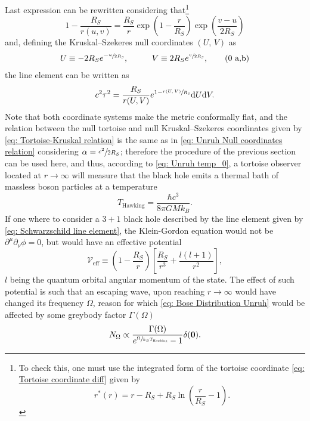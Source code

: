 Last expression can be rewritten considering that\footnote{To check this, one must use the integrated form of the tortoise coordinate \ref{eq: Tortoise coordinate diff} given by $$r^*(r)=r-R_S+R_S\ln\left(\frac{r}{R_S}-1\right).$$}
\begin{equation}
	1-\frac{R_S}{r\left(u,v\right)}=\frac{R_S}{r}\exp{\left(1-\frac{r}{R_S}\right)}\exp{\left(\frac{v-u}{2R_S}\right)}
\end{equation} 
and, defining the Kruskal–Szekeres null coordinates $(U,\,V)$ as
\begin{subequations}\label{eq: Tortoise-Kruskal relation}
	\begin{gather}
		U\equiv -2R_Se^{-\sfrac{u}{2R_S}},\hspace{1.0cm}V\equiv 2R_Se^{\sfrac{v}{2R_S}},\tag{\theequation \,\,a,b}
	\end{gather}
\end{subequations}
the line element can be written as
\begin{equation}
	c^2\tau^2=\frac{R_S}{r(U,V)}e^{1-\sfrac{r(U,V)}{R_S}}\text{d} U\text{d} V.
\end{equation}
Note that both coordinate systems make the metric conformally flat, and the relation between the null tortoise and null Kruskal–Szekeres coordinates given by \ref{eq: Tortoise-Kruskal relation} is the same as in \ref{eq: Unruh Null coordinates relation} considering $\alpha=\sfrac{c^2}{2R_S}$; therefore the procedure of the previous section can be used here, and thus, according to \ref{eq: Unruh temp_0}, a tortoise observer located at $r\to\infty$ will measure that the black hole emits a thermal bath of massless boson particles at a temperature 
\begin{equation}
	T_{\text{Hawking}}=\frac{\hbar c^3}{8\pi GMk_B}.
\end{equation}
If one where to consider a $3+1$ black hole \cite[sec.\,9.1.4]{QuantumEffects} described by the line element given by \ref{eq: Schwarzschild line element}, the Klein-Gordon equation would not be $\partial^\mu\partial_\nu\phi=0$, but would have an effective potential
\begin{equation}
	\mathcal{V}_{\text{eff}}\equiv\left(1-\frac{R_S}{r}\right)\left[\frac{R_S}{r^3}+\frac{l(l+1)}{r^2}\right],
\end{equation}
$l$ being the quantum orbital angular momentum of the state. The effect of such potential is such that an escaping wave, upon reaching $r\to\infty$ would have changed its frequency $\Omega$, reason for which \ref{eq: Bose Distribution Unruh} would be affected by some greybody factor $\Gamma(\Omega)$ 
\begin{equation}
	N_\Omega\propto\frac{\Gamma(\Omega)}{e^{\sfrac{\Omega}{k_BT_{\text{Hawking}}}}-1}\delta(\mathbf{0}).
\end{equation}
